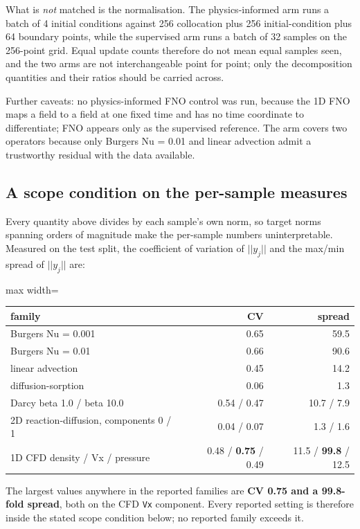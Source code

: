 \documentclass[preprint,12pt]{elsarticle}
\begin{document}
What is \emph{not} matched is the normalisation. The physics-informed arm runs a batch of 4 initial conditions against 256 collocation plus 256 initial-condition plus 64 boundary points, while the supervised arm runs a batch of 32 samples on the 256-point grid. Equal update counts therefore do not mean equal samples seen, and the two arms are not interchangeable point for point; only the decomposition quantities and their ratios should be carried across.

Further caveats: no physics-informed FNO control was run, because the 1D FNO maps a field to a field at one fixed time and has no time coordinate to differentiate; FNO appears only as the supervised reference. The arm covers two operators because only Burgers Nu = 0.01 and linear advection admit a trustworthy residual with the data available.

\subsection{A scope condition on the per-sample measures}

Every quantity above divides by each sample's own norm, so target norms spanning orders of magnitude make the per-sample numbers uninterpretable. Measured on the test split, the coefficient of variation of $||y_j||$ and the max/min spread of $||y_j||$ are:

\begin{center}
\begin{adjustbox}{max width=\linewidth}
\small
\begin{tabular}{lrr}
\toprule
family & CV & spread \\
\midrule
Burgers Nu = 0.001 & 0.65 & 59.5 \\
Burgers Nu = 0.01 & 0.66 & 90.6 \\
linear advection & 0.45 & 14.2 \\
diffusion-sorption & 0.06 & 1.3 \\
Darcy beta 1.0 / beta 10.0 & 0.54 / 0.47 & 10.7 / 7.9 \\
2D reaction-diffusion, components 0 / 1 & 0.04 / 0.07 & 1.3 / 1.6 \\
1D CFD density / Vx / pressure & 0.48 / \textbf{0.75} / 0.49 & 11.5 / \textbf{99.8} / 12.5 \\
\bottomrule
\end{tabular}
\end{adjustbox}
\end{center}


The largest values anywhere in the reported families are \textbf{CV 0.75 and a 99.8-fold spread}, both on the CFD \texttt{Vx} component. Every reported setting is therefore inside the stated scope condition below; no reported family exceeds it.
\end{document}
